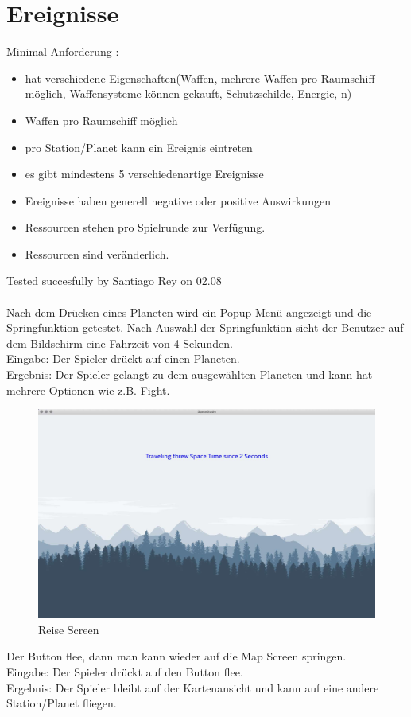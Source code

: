 \documentclass[12pt]{article}
\begin{document}
\section{Ereignisse}
Minimal Anforderung : 
\begin{itemize}
\item hat verschiedene Eigenschaften(Waffen, mehrere Waffen pro Raumschiff möglich, Waffensysteme können gekauft, Schutzschilde, Energie, n)
\item Waffen pro Raumschiff möglich
\item pro Station/Planet kann ein Ereignis eintreten
\item es gibt mindestens 5 verschiedenartige Ereignisse
\item Ereignisse haben generell negative oder positive Auswirkungen
\item Ressourcen stehen pro Spielrunde zur Verfügung.
\item Ressourcen sind veränderlich.
\end{itemize}


Tested succesfully by Santiago Rey on 02.08\\\\
Nach dem Drücken eines Planeten wird ein Popup-Menü angezeigt und die Springfunktion getestet. Nach Auswahl der Springfunktion sieht der Benutzer auf dem Bildschirm eine Fahrzeit von 4 Sekunden.\\
Eingabe: Der Spieler drückt auf einen Planeten.\\
Ergebnis: Der Spieler gelangt zu dem ausgewählten Planeten und kann hat mehrere Optionen wie z.B. Fight.
\begin{figure}[htp]
\centering
\includegraphics[scale=0.4]{TestProtocolBilder/traveling.jpg}
\caption{Reise Screen}
\end{figure}
\clearpage
Der Button flee, dann man kann wieder auf die Map Screen springen.\\
Eingabe: Der Spieler drückt auf den Button flee.\\
Ergebnis: Der Spieler bleibt auf der Kartenansicht und kann auf eine andere Station/Planet fliegen.\\
\newpage
\end{document}
